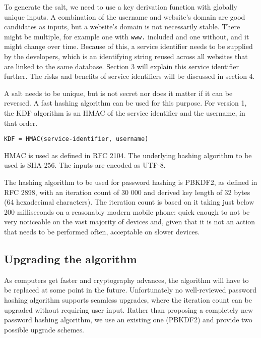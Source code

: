 \documentclass{paper}
\newcommand{\code}[1]{\texttt{\colorbox{gray!11}{#1}}}
\begin{document}
To generate the salt, we need to use a key derivation function with globally unique inputs. A
combination of the username and website's domain are good candidates as inputs, but a
website's domain is not necessarily stable. There might be multiple, for example one with
\code{www.} included and one without, and it might change over time. Because of this, a
service identifier needs to be supplied by the developers, which is an identifying string
reused across all websites that are linked to the same database. Section 3 will explain this
service identifier further. The risks and benefits of service identifiers will be discussed
in section 4.

A salt needs to be unique, but is not secret nor does it matter if it can be reversed. A fast
hashing algorithm can be used for this purpose. For version 1, the KDF algorithm is an HMAC
of the service identifier and the username, in that order.

\code{KDF = HMAC(service-identifier, username)}

HMAC is used as defined in RFC 2104\footnotemark. The underlying hashing algorithm to be used is SHA-256.
The inputs are encoded as UTF-8.


The hashing algorithm to be used for password hashing is PBKDF2, as defined in RFC
2898\footnotemark, with an iteration count of 30 000 and derived key length of 32 bytes (64
hexadecimal characters). The iteration count is based on it taking just below 200
milliseconds on a reasonably modern mobile phone: quick enough to not be very noticeable on
the vast majority of devices and, given that it is not an action that needs to be performed
often, acceptable on slower devices.


\subsection{Upgrading the algorithm}

As computers get faster and cryptography advances, the algorithm will have to be replaced
at some point in the future. Unfortunately no well-reviewed password hashing algorithm
supports seamless upgrades, where the iteration count can be upgraded without requiring user
input. Rather than proposing a completely new password hashing algorithm, we use an existing
one (PBKDF2) and provide two possible upgrade schemes.
\end{document}

